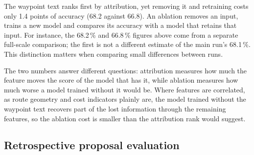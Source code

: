 \documentclass[conference,10pt,a4paper,IEEEoverridecommandlockouts]{IEEEtran}
\begin{document}

The waypoint text ranks first by attribution, yet removing it and
retraining costs only 1.4 points of accuracy (68.2 against 66.8).
An ablation removes an input, trains a new model and compares its accuracy
with a model that retains that input. For instance, the 68.2\,\% and
66.8\,\% figures above come from a separate full-scale comparison;
the first is not a different estimate of the main run's 68.1\,\%.
This distinction matters when comparing small differences between runs.

The two numbers answer different questions: attribution measures how much
the feature moves the score of the model that has it, while ablation
measures how much worse a model trained without it would be. Where
features are correlated, as route geometry and cost indicators plainly
are, the model trained without the waypoint text recovers part of the
lost information through the remaining features, so the ablation cost is
smaller than the attribution rank would suggest.

\subsection{Retrospective proposal evaluation}

\end{document}
